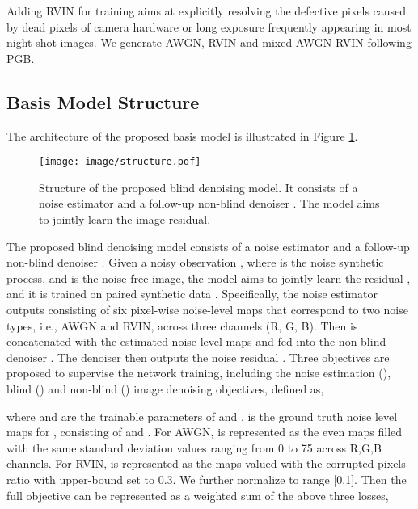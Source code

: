 \documentclass[letterpaper]{article} \usepackage{aaai20}  \usepackage{times}  \usepackage{helvet} \usepackage{courier}  \usepackage{comment}
\begin{document}
Adding RVIN for training aims at explicitly resolving the defective pixels caused by dead pixels of camera hardware or long exposure frequently appearing in most night-shot images. We generate AWGN, RVIN and mixed AWGN-RVIN following PGB\cite{xu2016patch}. 

\subsection{Basis Model Structure}
The architecture of the proposed basis model is illustrated in Figure \ref{fig:structure}. 
\begin{figure}[t]
	\begin{center}
		\texttt{[image: image/structure.pdf]}
	\end{center}
\caption{Structure of the proposed blind denoising model. It consists of a noise estimator  and a follow-up non-blind denoiser . The model aims to jointly learn the image residual. }
	\label{fig:structure}
\end{figure}
The proposed blind denoising model  consists of a noise estimator  and a follow-up non-blind denoiser . Given a noisy observation , where  is the noise synthetic process, and  is the noise-free image, the model aims to jointly learn the residual , and it is trained on paired synthetic data . Specifically, the noise estimator outputs  consisting of six pixel-wise noise-level maps that correspond to two noise types, i.e., AWGN and RVIN, across three channels (R, G, B). Then  is concatenated with the estimated noise level maps  and fed into the non-blind denoiser . The denoiser then outputs the noise residual . Three objectives are proposed to supervise the network training, including the noise estimation (), blind () and non-blind () image denoising objectives, defined as, 


 	\vspace{-4mm}
 
	\vspace{-4mm}

where  and  are the trainable parameters of  and .  is the ground truth noise level maps for , consisting of  and . For AWGN,  is represented as the even maps filled with the same standard deviation values ranging from 0 to 75 across R,G,B channels. For RVIN,  is represented as the maps valued with the corrupted pixels ratio with upper-bound set to 0.3. We further normalize  to range [0,1]. Then the full objective can be represented as a weighted sum of the above three losses, 
\end{document}

